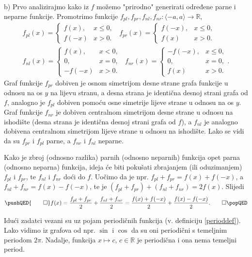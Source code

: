 \begin{proof*}
b) Prvo analizirajmo kako iz $f$ možemo "prirodno" generirati određene parne i neparne funkcije. Promotrimo funkcije $f_{pl}, f_{pr}, f_{nl}, f_{nr} : \langle -a, a\rangle \to \mathbb{R}$,
\begin{gather*}
f_{pl}(x)=\begin{cases}
f(x), & x\leq 0,\\
f(-x) & x>0.
\end{cases} \;\;
f_{pr}(x)=\begin{cases}
f(-x), & x\leq 0,\\
f(x) & x>0.
\end{cases}\\
f_{nl}(x)=\begin{cases}
f(x), & x< 0,\\
0, & x=0,\\
-f(-x) & x>0.
\end{cases} \;\;
f_{nr}(x)=\begin{cases}
-f(-x), & x\leq 0,\\
0, & x=0,\\
f(x) & x>0.
\end{cases}.
\end{gather*}
Graf funkcije $f_{pr}$ dobiven je osnom simetrijom desne strane grafa funkcije u odnosu na os $y$ na lijevu stranu, a desna strana je identična desnoj strani grafa od $f$, analogno je $f_{pl}$ dobiven pomoću osne simetrije lijeve strane u odnosu na os $y$. Graf funkcije $f_{nr}$ je dobiven centralnom simetrijom desne strane u odnosu na ishodište (desna strana je identična desnoj strani grafa od $f$), a $f_{nl}$ je analogno dobivena centralnom simetrijom lijeve strane u odnosu na ishodište. Lako se vidi da su $f_{pr}$ i $f_{pl}$ parne, a $f_{nr}$ i $f_{nl}$ neparne. 

Kako je zbroj (odnosno razlika) parnih (odnosno neparnih) funkcija opet parna (odnosno neparna) funkcija, ideja će biti pokušati zbrajanjem (ili oduzimanjem) $f_{pl}$ i $f_{pr}$, te $f_{nl}$ i $f_{nr}$ doći do $f$. Uočimo da je npr. $f_{pl}+f_{pr}=f(x)+f(-x)$, a $f_{nl}+f_{nr}=f(x)-f(-x)$, te je $\left(f_{pl}+f_{pr}\right)+\left(f_{nl}+f_{nr}\right)=2f(x)$. Slijedi
\[
\pushQED{\qed}
f(x)=\dfrac{f_{pl}+f_{pr}}{2}+\dfrac{f_{nl}+f_{nr}}{2}=\dfrac{f(x)+f(-x)}{2}+\dfrac{f(x)-f(-x)}{2}.\qedhere
\popQED
\]
\end{proof*}
Idući zadatci vezani su uz pojam periodičnih funkcija (v. definiciju \ref{perioddef}). Lako vidimo iz grafova od npr. \(\sin\) i \(\cos\) da su oni periodični s temeljnim periodom \(2\pi\). Nadalje, funkcija \(x\mapsto c\), \(c\in \mathbb{R}\) je periodična i ona nema temeljni period.
